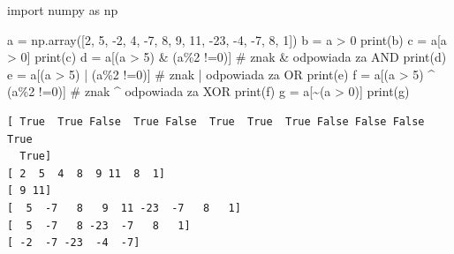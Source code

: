 \documentclass[
  letterpaper,
  DIV=11,
  numbers=noendperiod]{scrreprt}
\newenvironment{Shaded}{\begin{snugshade}}{\end{snugshade}}
\newcommand{\BuiltInTok}[1]{\textcolor[rgb]{0.00,0.23,0.31}{#1}}
\newcommand{\CommentTok}[1]{\textcolor[rgb]{0.37,0.37,0.37}{#1}}
\newcommand{\DecValTok}[1]{\textcolor[rgb]{0.68,0.00,0.00}{#1}}
\newcommand{\ImportTok}[1]{\textcolor[rgb]{0.00,0.46,0.62}{#1}}
\newcommand{\NormalTok}[1]{\textcolor[rgb]{0.00,0.23,0.31}{#1}}
\newcommand{\OperatorTok}[1]{\textcolor[rgb]{0.37,0.37,0.37}{#1}}
\begin{document}
\begin{Shaded}
\begin{Highlighting}[]
\ImportTok{import}\NormalTok{ numpy }\ImportTok{as}\NormalTok{ np}

\NormalTok{a }\OperatorTok{=}\NormalTok{ np.array([}\DecValTok{2}\NormalTok{, }\DecValTok{5}\NormalTok{, }\OperatorTok{{-}}\DecValTok{2}\NormalTok{, }\DecValTok{4}\NormalTok{, }\OperatorTok{{-}}\DecValTok{7}\NormalTok{, }\DecValTok{8}\NormalTok{, }\DecValTok{9}\NormalTok{, }\DecValTok{11}\NormalTok{, }\OperatorTok{{-}}\DecValTok{23}\NormalTok{, }\OperatorTok{{-}}\DecValTok{4}\NormalTok{, }\OperatorTok{{-}}\DecValTok{7}\NormalTok{, }\DecValTok{8}\NormalTok{, }\DecValTok{1}\NormalTok{])}
\NormalTok{b }\OperatorTok{=}\NormalTok{ a }\OperatorTok{\textgreater{}} \DecValTok{0}
\BuiltInTok{print}\NormalTok{(b)}
\NormalTok{c }\OperatorTok{=}\NormalTok{ a[a }\OperatorTok{\textgreater{}} \DecValTok{0}\NormalTok{]}
\BuiltInTok{print}\NormalTok{(c)}
\NormalTok{d }\OperatorTok{=}\NormalTok{ a[(a }\OperatorTok{\textgreater{}} \DecValTok{5}\NormalTok{) }\OperatorTok{\&}\NormalTok{ (a}\OperatorTok{\%}\DecValTok{2} \OperatorTok{!=}\DecValTok{0}\NormalTok{)] }\CommentTok{\# znak \& odpowiada za AND}
\BuiltInTok{print}\NormalTok{(d)}
\NormalTok{e }\OperatorTok{=}\NormalTok{ a[(a }\OperatorTok{\textgreater{}} \DecValTok{5}\NormalTok{) }\OperatorTok{|}\NormalTok{ (a}\OperatorTok{\%}\DecValTok{2} \OperatorTok{!=}\DecValTok{0}\NormalTok{)] }\CommentTok{\# znak | odpowiada za OR}
\BuiltInTok{print}\NormalTok{(e)}
\NormalTok{f }\OperatorTok{=}\NormalTok{ a[(a }\OperatorTok{\textgreater{}} \DecValTok{5}\NormalTok{) }\OperatorTok{\^{}}\NormalTok{ (a}\OperatorTok{\%}\DecValTok{2} \OperatorTok{!=}\DecValTok{0}\NormalTok{)] }\CommentTok{\# znak \^{} odpowiada za XOR}
\BuiltInTok{print}\NormalTok{(f)}
\NormalTok{g }\OperatorTok{=}\NormalTok{ a[}\OperatorTok{\textasciitilde{}}\NormalTok{(a }\OperatorTok{\textgreater{}} \DecValTok{0}\NormalTok{)]}
\BuiltInTok{print}\NormalTok{(g)}
\end{Highlighting}
\end{Shaded}

\begin{verbatim}
[ True  True False  True False  True  True  True False False False  True
  True]
[ 2  5  4  8  9 11  8  1]
[ 9 11]
[  5  -7   8   9  11 -23  -7   8   1]
[  5  -7   8 -23  -7   8   1]
[ -2  -7 -23  -4  -7]
\end{verbatim}
\end{document}
